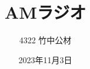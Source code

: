 \documentclass[11pt,dvipdfmx]{jarticle}
\begin{document}
\title{AMラジオ}
\author{4322 竹中公材}
\date{2023年11月3日}
\maketitle











\renewcommand{\refname}{参考文献}


\end{document}
